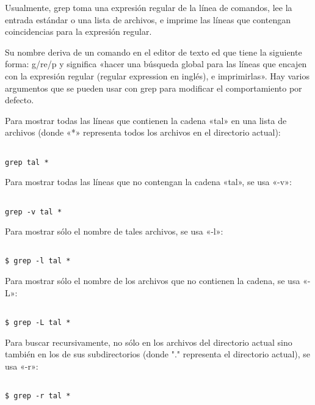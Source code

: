 \documentclass{article}
\begin{document}
Usualmente, grep toma una expresión regular de la línea de comandos, lee la entrada estándar o una lista de archivos, e imprime las líneas que contengan coincidencias para la expresión regular.

Su nombre deriva de un comando en el editor de texto ed que tiene la siguiente forma: g/re/p y significa «hacer una búsqueda global para las líneas que encajen con la expresión regular (regular expression en inglés), e imprimirlas». Hay varios argumentos que se pueden usar con grep para modificar el comportamiento por defecto.

Para mostrar todas las líneas que contienen la cadena «tal» en una lista de archivos (donde «*» representa todos los archivos en el directorio actual):

\begin{verbatim}

grep tal *

\end{verbatim}

Para mostrar todas las líneas que no contengan la cadena «tal», se usa «-v»:

\begin{verbatim}

grep -v tal *

\end{verbatim}

Para mostrar sólo el nombre de tales archivos, se usa «-l»:

\begin{verbatim}

$ grep -l tal *

\end{verbatim}

Para mostrar sólo el nombre de los archivos que no contienen la cadena, se usa «-L»:

\begin{verbatim}

$ grep -L tal *

\end{verbatim}

Para buscar recursivamente, no sólo en los archivos del directorio actual sino también en los de sus subdirectorios (donde "." representa el directorio actual), se usa «-r»:

\begin{verbatim}

$ grep -r tal *

\end{verbatim}
\end{document}
